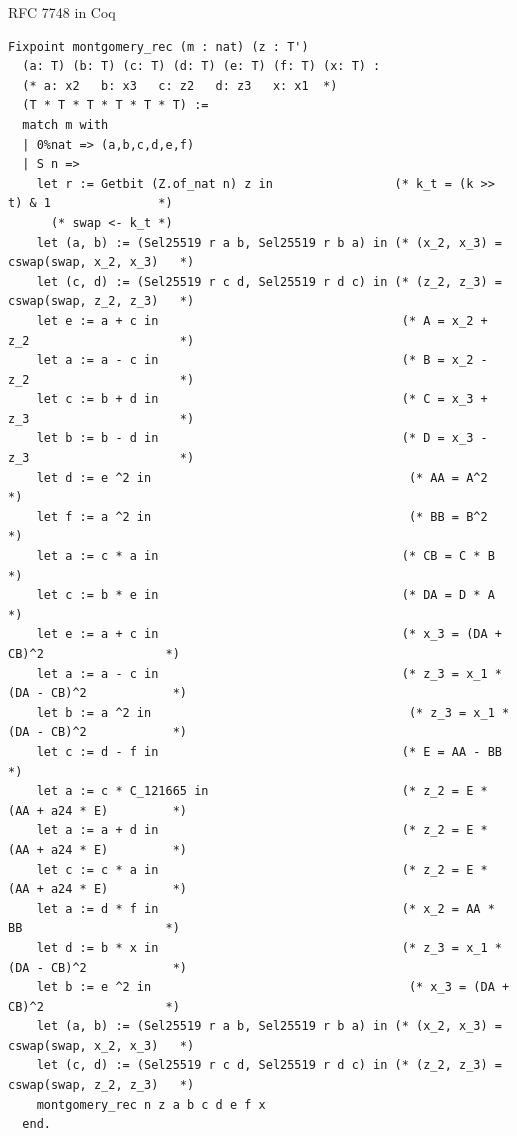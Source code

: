 \documentclass[8pt,aspectratio=169]{beamer}
\begin{document}
%
%
\begin{frame}[fragile]{RFC 7748 in Coq}
	\begin{center}
		\begin{lstlisting}[language=Coq]
  Fixpoint montgomery_rec (m : nat) (z : T')
  (a: T) (b: T) (c: T) (d: T) (e: T) (f: T) (x: T) :
  (* a: x2   b: x3   c: z2   d: z3   x: x1  *)
  (T * T * T * T * T * T) :=
  match m with
  | 0%nat => (a,b,c,d,e,f)
  | S n =>
    let r := Getbit (Z.of_nat n) z in                 (* k_t = (k >> t) & 1               *)
      (* swap <- k_t *)
    let (a, b) := (Sel25519 r a b, Sel25519 r b a) in (* (x_2, x_3) = cswap(swap, x_2, x_3)   *)
    let (c, d) := (Sel25519 r c d, Sel25519 r d c) in (* (z_2, z_3) = cswap(swap, z_2, z_3)   *)
    let e := a + c in                                  (* A = x_2 + z_2                     *)
    let a := a - c in                                  (* B = x_2 - z_2                     *)
    let c := b + d in                                  (* C = x_3 + z_3                     *)
    let b := b - d in                                  (* D = x_3 - z_3                     *)
    let d := e ^2 in                                    (* AA = A^2                         *)
    let f := a ^2 in                                    (* BB = B^2                         *)
    let a := c * a in                                  (* CB = C * B                      *)
    let c := b * e in                                  (* DA = D * A                      *)
    let e := a + c in                                  (* x_3 = (DA + CB)^2                 *)
    let a := a - c in                                  (* z_3 = x_1 * (DA - CB)^2            *)
    let b := a ^2 in                                    (* z_3 = x_1 * (DA - CB)^2            *)
    let c := d - f in                                  (* E = AA - BB                     *)
    let a := c * C_121665 in                           (* z_2 = E * (AA + a24 * E)         *)
    let a := a + d in                                  (* z_2 = E * (AA + a24 * E)         *)
    let c := c * a in                                  (* z_2 = E * (AA + a24 * E)         *)
    let a := d * f in                                  (* x_2 = AA * BB                    *)
    let d := b * x in                                  (* z_3 = x_1 * (DA - CB)^2            *)
    let b := e ^2 in                                    (* x_3 = (DA + CB)^2                 *)
    let (a, b) := (Sel25519 r a b, Sel25519 r b a) in (* (x_2, x_3) = cswap(swap, x_2, x_3)   *)
    let (c, d) := (Sel25519 r c d, Sel25519 r d c) in (* (z_2, z_3) = cswap(swap, z_2, z_3)   *)
    montgomery_rec n z a b c d e f x
  end.
  \end{lstlisting}
	\end{center}
\end{frame}
\end{document}
